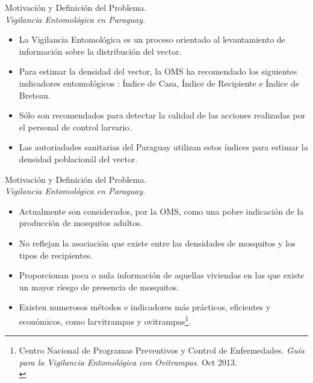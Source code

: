 
\begin{frame}[c]{Motivación y Definición del Problema.\\\textit{Vigilancia Entomológica en Paraguay.}}

    \begin{itemize}
      \item La Vigilancia Entomológica es un proceso orientado al levantamiento de información sobre la distribución del vector.

      \item Para estimar la densidad del vector, la OMS ha recomendado los siguientes indicadores entomológicos : Índice de Casa, Índice de Recipiente e Índice de Breteau.

      \item Sólo son recomendados para detectar la calidad de las acciones realizadas por el personal de control larvario.

      \item Las autoriadades sanitarias del Paraguay utilizan estos índices para estimar la densidad poblacionál del vector.

    \end{itemize}
\end{frame}

\begin{frame}[c]{Motivación y Definición del Problema.\\\textit{Vigilancia Entomológica en Paraguay.}}
\begin{itemize}
      \item Actualmente son considerados, por la OMS, como una pobre indicación de la producción de mosquitos adultos.

      \item No reflejan la asociación que existe entre las densidades de mosquitos y los tipos de recipientes.

      \item Proporcionan poca o nula información de aquellas viviendas en las que existe un mayor riesgo de presencia de mosquitos.

      \item Existen numerosos métodos e indicadores más prácticos, eficientes y económicos, como larvitrampas y ovitrampas\footnote{Centro Nacional de Programas Preventivos y Control de Enfermedades. \textit{Guía para la Vigilancia Entomológica con Ovitrampas}. Oct 2013.\\}.

    \end{itemize}
\end{frame}

